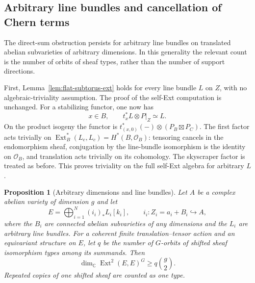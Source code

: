 \documentclass[11pt]{article}
\newtheorem{proposition}[theorem]{Proposition}
\theoremstyle{definition}
\theoremstyle{remark}
\begin{document}
\subsection{Arbitrary line bundles and cancellation of Chern terms}
\label{subsec:subtorus-generalization}

The direct-sum obstruction persists for arbitrary line bundles on
translated abelian subvarieties of arbitrary dimensions.  In this
generality the relevant count is the number of orbits of sheaf
types, rather than the number of support directions.

First, Lemma~\ref{lem:flat-subtorus-ext} holds for every line bundle
$L$ on $Z$, with no algebraic-triviality assumption.  The proof of
the self-Ext computation is unchanged.  For a stabilizing functor,
one now has
\[
 x\in B,\qquad t_x^*L\otimes P|_Z\simeq L.
\]
On the product isogeny the functor is
$t_{(x,0)}^*(-)\otimes(P_B\boxtimes P_C)$.  The first factor acts
trivially on
$\operatorname{Ext}^*_B(L_c,L_c)=H^*(B,\mathcal O_B)$:
tensoring cancels in the endomorphism sheaf, conjugation by the
line-bundle isomorphism is the identity on $\mathcal O_B$, and
translation acts trivially on its cohomology.  The skyscraper
factor is treated as before.  This proves triviality on the full
self-Ext algebra for arbitrary $L$.

\begin{proposition}[Arbitrary dimensions and line bundles]
\label{prop:arbitrary-subtorus-orbit-ext}
Let $A$ be a complex abelian variety of dimension $g$ and let
\[
 E=\bigoplus_{i=1}^N (i_i)_*L_i[k_i],
 \qquad i_i:Z_i=a_i+B_i\hookrightarrow A,
\]
where the $B_i$ are connected abelian subvarieties of any dimensions
and the $L_i$ are arbitrary line bundles.  For a coherent finite
translation--tensor action and an equivariant structure on $E$,
let $q$ be the number of $G$-orbits of shifted sheaf isomorphism
types among its summands.  Then
\[
 \dim_{\mathbb C}\operatorname{Ext}^2(E,E)^G\geq q\binom g2.
\]
Repeated copies of one shifted sheaf are counted as one type.
\end{proposition}
\end{document}
